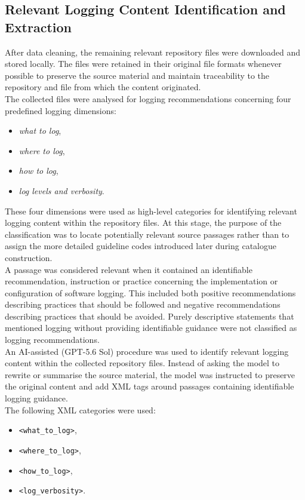 \subsection{Relevant Logging Content Identification and Extraction}
\label{sec:meth_content_extraction}

After data cleaning, the remaining relevant repository files were downloaded and
stored locally. The files were retained in their original file formats whenever
possible to preserve the source material and maintain traceability
to the repository and file from which the content originated.
\\
The collected files were analysed for logging recommendations concerning four
predefined logging dimensions:

\begin{itemize}
    \item \textit{what to log},
    \item \textit{where to log},
    \item \textit{how to log},
    \item \textit{log levels and verbosity}.
\end{itemize}

These four dimensions were used as high-level categories for identifying relevant
logging content within the repository files. At this stage, the purpose of the
classification was to locate potentially relevant source passages rather than to
assign the more detailed guideline codes introduced later during catalogue
construction.
\\
A passage was considered relevant when it contained an identifiable recommendation,
instruction or practice concerning the implementation or configuration of software
logging. This included both positive recommendations describing practices that should
be followed and negative recommendations describing practices that should be avoided.
Purely descriptive statements that mentioned logging without providing identifiable
guidance were not classified as logging recommendations.
\\
An AI-assisted (GPT-5.6 Sol) procedure was used to identify relevant logging content within the
collected repository files. Instead of asking the model to rewrite or summarise the
source material, the model was instructed to preserve the original content and add
XML tags around passages containing identifiable logging guidance.
\\
The following XML categories were used:

\begin{itemize}
    \item \texttt{<what\_to\_log>},
    \item \texttt{<where\_to\_log>},
    \item \texttt{<how\_to\_log>},
    \item \texttt{<log\_verbosity>}.
\end{itemize}

